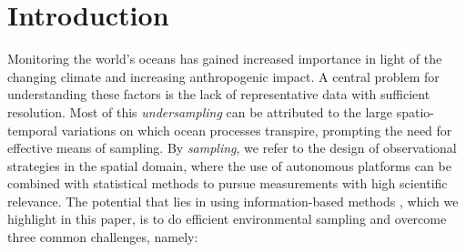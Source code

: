 \documentclass[aoas]{imsart}
\begin{document}
\section{Introduction}

Monitoring the world's oceans has gained increased importance in 
light of the changing climate and increasing anthropogenic impact. A
central problem for understanding these factors is the lack of
representative data with sufficient resolution. Most of this
\emph{undersampling} can be attributed to the large spatio-temporal
variations on which ocean processes transpire, prompting the need for
effective means of sampling. By \emph{sampling}, we refer to the design of observational strategies in the spatial domain, where the use of autonomous platforms can be combined with statistical methods to pursue measurements with high scientific relevance. The potential that lies in using information-based methods \citep{das11b,Das2015,fossum18b,fossuminformation}, which we highlight in this paper, is to do efficient environmental sampling and overcome three common challenges, namely:



\end{document}
